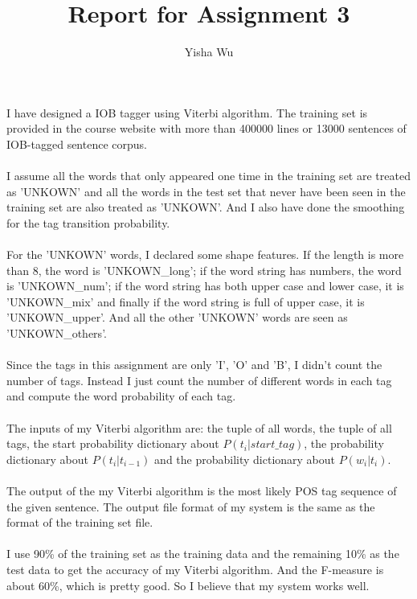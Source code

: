 \documentclass{article}
\begin{document}
\title{Report for Assignment 3}
\author{Yisha Wu}
\maketitle

\section*{}
I have designed a IOB tagger using Viterbi algorithm. The training set is provided in the course website with more than 400000 lines or 13000 sentences of IOB-tagged sentence corpus.\\\\
I assume all the words that only appeared one time in the training set are treated as 'UNKOWN' and all the words in the test set that never have been seen in the training set are also treated as 'UNKOWN'. And I also have done the smoothing for the tag transition probability.\\\\
For the 'UNKOWN' words, I declared some shape features. If the length is more than 8, the word is 'UNKOWN\_long'; if the word string has numbers, the word is 'UNKOWN\_num'; if the word string has both upper case and lower case, it is 'UNKOWN\_mix' and finally if the word string is full of upper case, it is 'UNKOWN\_upper'. And all the other 'UNKOWN' words are seen as 'UNKOWN\_others'.\\\\
Since the tags in this assignment are only 'I', 'O' and 'B', I didn't count the number of tags. Instead I just count the number of different words in each tag and compute the word probability of each tag.\\\\
The inputs of my Viterbi algorithm are: the tuple of all words, the tuple of all tags, the start probability dictionary about $P(t_i|start\_tag)$, the probability dictionary about $P(t_i|t_{i-1})$ and the probability dictionary about $P(w_i|t_i)$. \\\\
The output of the my Viterbi algorithm is the most likely POS tag sequence of the given sentence. The output file format of my system is the same as the format of the training set file.\\\\
I use 90\% of the training set as the training data and the remaining 10\% as the test data to get the accuracy of my Viterbi algorithm. And the F-measure is about 60\%, which is pretty good. So I believe that my system works well.
\end{document}
